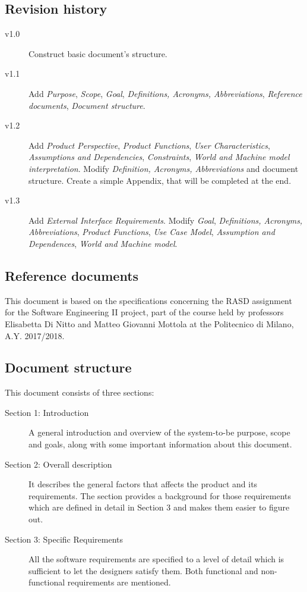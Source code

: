 \documentclass{article}
\begin{document}
	\subsection{Revision history}
	\begin{description}
	\item[v1.0] Construct basic document's structure.
	\item[v1.1] Add \textit{Purpose}, \textit{Scope}, \textit{Goal}, \textit{Definitions, Acronyms, Abbreviations}, \textit{Reference documents}, \textit{Document structure}.
	\item[v1.2] Add \textit{Product Perspective}, \textit{Product Functions}, \textit{User Characteristics}, \textit{Assumptions and Dependencies}, \textit{Constraints}, \textit{World and Machine model interpretation}. Modify \textit{Definition, Acronyms, Abbreviations} and document structure. Create a simple Appendix, that will be completed at the end.
	\item[v1.3] Add \textit{External Interface Requirements}. Modify \textit{Goal}, \textit{Definitions, Acronyms, Abbreviations}, \textit{Product Functions}, \textit{Use Case Model}, \textit{Assumption and Dependences}, \textit{World and Machine model}.
	\end{description}
	
	
	\subsection{Reference documents}
	This document is based on the specifications concerning the RASD assignment for the Software Engineering II project, part of the course held by professors Elisabetta Di Nitto and Matteo Giovanni Mottola at the Politecnico di Milano, A.Y. 2017/2018.
	
	
	\subsection{Document structure}
	This document consists of three sections:

	\begin{description}
	\item[Section 1: Introduction] A general introduction and overview of the system-to-be purpose, scope and goals, along with some important information about this document.
	\item[Section 2: Overall description] It describes the general factors that affects the product and its requirements. The section provides a background for those requirements which are defined in detail in Section 3 and makes them easier to figure out.
	\item[Section 3: Specific Requirements] All the software requirements are specified to a level of detail which is sufficient to let the designers satisfy them. Both functional and non-functional requirements are mentioned.
	\end{description}
	
\end{document}
